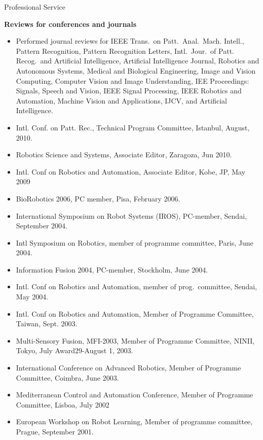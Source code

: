 \documentclass{article}
\begin{document}
\begin{cv}
\begin{cvlist}{Professional Service}
\item {\bf Reviews for conferences and journals}
  \begin{itemize}
    \item Performed journal reviews for IEEE Trans.\ on Patt.\ Anal.\ Mach. Intell.,
          Pattern Recognition, Pattern Recognition Letters, Intl.\ Jour.\ of Patt.\@
          Recog.\ and Artificial Intelligence, Artificial Intelligence Journal,
          Robotics and Autonomous Systems, Medical and Biological Engineering,
          Image and Vision Computing, Computer Vision and Image Understanding,
          IEE Proceedings: Signals, Speech and Vision, IEEE Signal Processing,
          IEEE Robotics and Automation, Machine Vision and Applications, IJCV,
          and Artificial Intelligence.
    \item Intl. Conf. on Patt. Rec., Technical Program Committee, Istanbul,
          August, 2010.
    \item Robotics Science and Systems, Associate Editor, Zaragoza, Jun 2010.
    \item Intl. Conf on Robotics and Automation, Associate Editor, Kobe, JP, May
          2009
    \item BioRobotics 2006, PC member, Pisa, February 2006.
    \item International Symposium on Robot Systems (IROS), PC-member, Sendai,
          September 2004.
    \item Intl Symposium on Robotics, member of programme committee, Paris, June
          2004.
    \item Information Fusion 2004, PC-member, Stockholm, June 2004.
    \item Intl. Conf on Robotics and Automation, member of prog.\ committee, Sendai,
          May 2004.
    \item Intl. Conf on Robotics and Automation, Member of Programme Committee,
          Taiwan, Sept. 2003.
    \item Multi-Sensory Fusion, MFI-2003, Member of Programme Committee, NINII,
          Tokyo, July Award29-August 1, 2003.
    \item International Conference on Advanced Robotics, Member of Programme
          Committee, Coimbra, June 2003.
    \item Mediterranean Control and Automation Conference, Member of Programme
          Committee, Lisboa, July 2002
    \item European Workshop on Robot Learning, Member of programme committee,
          Prague, September 2001.

\end{itemize}
\end{cvlist}
\end{cv}
\end{document}
